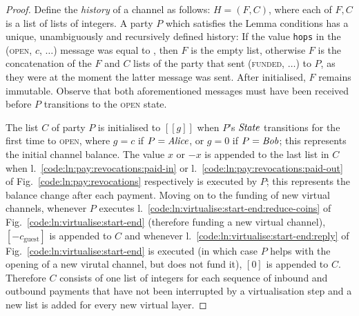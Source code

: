 \begin{proof}
  Define the \emph{history} of a channel as follows: $H = (F, C)$, where each of
  $F, C$ is a list of lists of integers. A party $P$ which satisfies the Lemma
  conditions has a unique, unambiguously and recursively defined history: If the
  value \texttt{hops} in the (\textsc{open}, $c$, $\dots$) message was equal to
  \ledger, then $F$ is the empty list, otherwise $F$ is the concatenation of the
  $F$ and $C$ lists of the party that sent (\textsc{funded}, $\dots$) to $P$, as
  they were at the moment the latter message was sent. After initialised, $F$
  remains immutable. Observe that both aforementioned messages must have been
  received before $P$ transitions to the \textsc{open} state.

  The list $C$ of party $P$ is initialised to $[[g]]$ when $P$'s $\itistate$
  transitions for the first time to \textsc{open}, where $g = c$ if $P =
  \mathit{Alice}$, or $g = 0$ if $P = \mathit{Bob}$; this represents the initial channel
  balance. The value $x$ or $-x$ is appended to the last list in $C$ when
  l.~\ref{code:ln:pay:revocations:paid-in} or
  l.~\ref{code:ln:pay:revocations:paid-out} of
  Fig.~\ref{code:ln:pay:revocations} respectively is executed by $P$; this
  represents the balance change after each payment. Moving on to the funding of
  new virtual channels, whenever $P$ executes
  l.~\ref{code:ln:virtualise:start-end:reduce-coins} of
  Fig.~\ref{code:ln:virtualise:start-end} (therefore funding a new virtual
  channel), $[-c_{\mathrm{guest}}]$ is appended to $C$ and whenever
  l.~\ref{code:ln:virtualise:start-end:reply} of
  Fig.~\ref{code:ln:virtualise:start-end} is executed (in which case $P$ helps
  with the opening of a new virutal channel, but does not fund it), $[0]$ is
  appended to $C$. Therefore $C$ consists of one list of integers for each
  sequence of inbound and outbound payments that have not been interrupted by a
  virtualisation step and a new list is added for every new virtual layer.


\end{proof}
